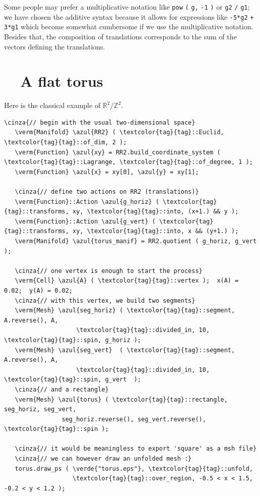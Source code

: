 Some people may prefer a multiplicative notation like {\small\tt pow} {\small\tt (} {\small\tt g,}
{\small\tt -1} {\small\tt )} or {\small\tt g2} {\small\tt /} {\small\tt g1};
we have chosen the additive syntax because it allows for expressions like {\small\tt -5*g2}
{\small\tt +} {\small\tt 3*g1} which become somewhat cumbersome if we use
the multiplicative notation.
Besides that, the composition of translations corresponds to the sum of the vectors
defining the translations.


\section{~~A flat torus}\label{\numb section 7.\numb parag 4}

Here is the classical example of $ \mathbb{R}^2/{\mathbb Z}^2 $.

\begin{Verbatim}[commandchars=\\\{\},formatcom=\small\tt,frame=single,
   label=parag-\ref{\numb section 7.\numb parag 4}.cpp,rulecolor=\color{coment},
   baselinestretch=0.94,framesep=2mm                                            ]
   \cinza{// begin with the usual two-dimensional space}
   \verm{Manifold} \azul{RR2} ( \textcolor{tag}{tag}::Euclid, \textcolor{tag}{tag}::of_dim, 2 );
   \verm{Function} \azul{xy} = RR2.build_coordinate_system ( \textcolor{tag}{tag}::Lagrange, \textcolor{tag}{tag}::of_degree, 1 );
   \verm{Function} \azul{x} = xy[0], \azul{y} = xy[1];

   \cinza{// define two actions on RR2 (translations)}
   \verm{Function}::Action \azul{g_horiz} ( \textcolor{tag}{tag}::transforms, xy, \textcolor{tag}{tag}::into, (x+1.) && y );
   \verm{Function}::Action \azul{g_vert} ( \textcolor{tag}{tag}::transforms, xy, \textcolor{tag}{tag}::into, x && (y+1.) );
   \verm{Manifold} \azul{torus_manif} = RR2.quotient ( g_horiz, g_vert );

   \cinza{// one vertex is enough to start the process}
   \verm{Cell} \azul{A} ( \textcolor{tag}{tag}::vertex );  x(A) = 0.02;  y(A) = 0.02;
   \cinza{// with this vertex, we build two segments}
   \verm{Mesh} \azul{seg_horiz} ( \textcolor{tag}{tag}::segment, A.reverse(), A,
                    \textcolor{tag}{tag}::divided_in, 10, \textcolor{tag}{tag}::spin, g_horiz );
   \verm{Mesh} \azul{seg_vert}  ( \textcolor{tag}{tag}::segment, A.reverse(), A,
                    \textcolor{tag}{tag}::divided_in, 10, \textcolor{tag}{tag}::spin, g_vert  );
   \cinza{// and a rectangle}
   \verm{Mesh} \azul{torus} ( \textcolor{tag}{tag}::rectangle, seg_horiz, seg_vert,
                seg_horiz.reverse(), seg_vert.reverse(), \textcolor{tag}{tag}::spin );

   \cinza{// it would be meaningless to export 'square' as a msh file}
   \cinza{// we can however draw an unfolded mesh :}
   torus.draw_ps ( \verde{"torus.eps"}, \textcolor{tag}{tag}::unfold,
                   \textcolor{tag}{tag}::over_region, -0.5 < x < 1.5, -0.2 < y < 1.2 );
\end{Verbatim}

